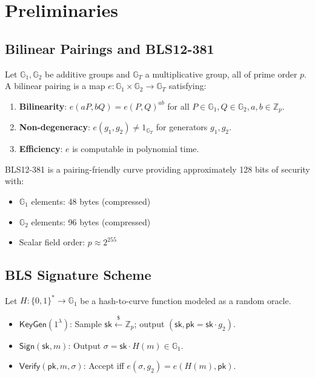 \section{Preliminaries}
\label{sec:prelim}

\subsection{Bilinear Pairings and BLS12-381}

Let $\mathbb{G}_1, \mathbb{G}_2$ be additive groups and $\mathbb{G}_T$ a multiplicative group, all of prime order $p$. A bilinear pairing is a map $e : \mathbb{G}_1 \times \mathbb{G}_2 \to \mathbb{G}_T$ satisfying:
\begin{enumerate}
    \item \textbf{Bilinearity}: $e(aP, bQ) = e(P, Q)^{ab}$ for all $P \in \mathbb{G}_1, Q \in \mathbb{G}_2, a, b \in \mathbb{Z}_p$.
    \item \textbf{Non-degeneracy}: $e(g_1, g_2) \neq 1_{\mathbb{G}_T}$ for generators $g_1, g_2$.
    \item \textbf{Efficiency}: $e$ is computable in polynomial time.
\end{enumerate}

BLS12-381 \cite{bowe2017bls12381} is a pairing-friendly curve providing approximately 128 bits of security with:
\begin{itemize}
    \item $\mathbb{G}_1$ elements: 48 bytes (compressed)
    \item $\mathbb{G}_2$ elements: 96 bytes (compressed)
    \item Scalar field order: $p \approx 2^{255}$
\end{itemize}

\subsection{BLS Signature Scheme}

\begin{definition}
Let $H : \{0,1\}^* \to \mathbb{G}_1$ be a hash-to-curve function modeled as a random oracle.
\begin{itemize}
    \item $\mathsf{KeyGen}(1^\lambda)$: Sample $\mathsf{sk} \xleftarrow{\$} \mathbb{Z}_p$; output $(\mathsf{sk}, \mathsf{pk} = \mathsf{sk} \cdot g_2)$.
    \item $\mathsf{Sign}(\mathsf{sk}, m)$: Output $\sigma = \mathsf{sk} \cdot H(m) \in \mathbb{G}_1$.
    \item $\mathsf{Verify}(\mathsf{pk}, m, \sigma)$: Accept iff $e(\sigma, g_2) = e(H(m), \mathsf{pk})$.
\end{itemize}
\end{definition}

